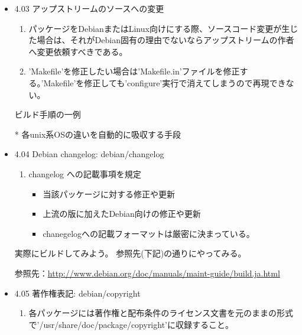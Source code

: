 \documentclass[mingoth,a4paper]{jsarticle}
\begin{document}
\begin{itemize}
\item 4.03 アップストリームのソースへの変更
  \begin{enumerate}
  \item パッケージをDebianまたはLinux向けにする際、ソースコード変更が生じた場合は、それがDebian固有の理由でないならアップストリームの作者へ変更依頼すべきである。
  \item 'Makefile'を修正したい場合は'Makefile.in'ファイルを修正する。'Makefile'を修正しても'configure'実行で消えてしまうので再現できない。
  \end{enumerate}

  \begin{itembox}[l]{ビルド手順の一例}
    * 各unix系OSの違いを自動的に吸収する手段
  \end{itembox}

\item 4.04 Debian changelog: debian/changelog
  \begin{enumerate}
  \item changelog への記載事項を規定
    \begin{itemize}
    \item 当該パッケージに対する修正や更新
    \item 上流の版に加えたDebian向けの修正や更新
    \item chanegelogへの記載フォーマットは厳密に決まっている。
    \end{itemize}
  \end{enumerate}

  \begin{itembox}[l]{実際にビルドしてみよう。}
    参照先(下記)の通りにやってみる。

    参照先：\url{http://www.debian.org/doc/manuals/maint-guide/build.ja.html}
  \end{itembox}

\item 4.05 著作権表記: debian/copyright
  \begin{enumerate}
  \item 各パッケージには著作権と配布条件のライセンス文書を元のままの形式で'/usr/share/doc/package/copyright'に収録すること。
  \end{enumerate}


\end{itemize}
\end{document}

